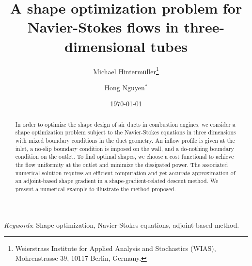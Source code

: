 \documentclass[oneside]{article}
\title{A shape optimization problem for Navier-Stokes flows in three-dimensional tubes}
\author{Michael Hinterm\"uller\thanks{Weierstrass Institute for Applied Analysis and Stochastics (WIAS), Mohrenstrasse 39, 10117 Berlin, Germany.} \and Hong Nguyen${}^*$}
\date{\today}
\begin{document}
\maketitle
\thispagestyle{empty}
\begin{abstract}
    In order to optimize the shape design of air ducts in combustion engines, we consider a shape optimization problem subject to the Navier-Stokes equations in three dimensions with mixed boundary conditions in the duct geometry. An inflow profile is given at the inlet, a no-slip boundary condition is imposed on the wall, and a do-nothing boundary condition on the outlet. To find optimal shapes, we choose a cost functional to achieve the flow uniformity at the outlet and minimize the dissipated power. The associated numerical solution requires an efficient computation and yet accurate approximation of an adjoint-based shape gradient in a shape-gradient-related descent method. We present a numerical example to illustrate the method proposed.
\end{abstract}
\textit{Keywords}: Shape optimization, Navier-Stokes equations, adjoint-based method.
\end{document}
